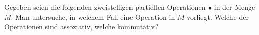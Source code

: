 \documentclass[a4paper, 12pt, margins=3cm]{homework}
\newcommand{\R}{\mathbb{R}}
\newcommand{\N}{\mathbb{N}}
\newcommand{\Q}{\mathbb{Q}}
\begin{document}
  \begin{problem}
    Gegeben seien die folgenden zweistelligen partiellen Operationen $\bullet$ in
    der Menge $M$. Man untersuche, in welchem Fall eine Operation in $M$ vorliegt.
    Welche der Operationen sind assoziativ, welche kommutativ?
  \end{problem}
\end{document}
